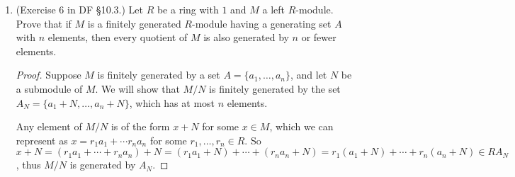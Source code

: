 \documentclass[10pt]{article}
\begin{document}
\begin{enumerate}
\begin{proof}
We may assume $R$ is not a field, since we are taking the result for granted in that case.  Therefore, $R$ contains a nonzero, proper ideal; by Proposition 11 in \S 7.4, this ideal must be contained in some maximal ideal $I$.  $R$ is commutative, so $IR = I$ and $R / IR = R / I$ is a field.  Therefore, by the result we are taking for granted, $(R/IR)^n \cong (R/IR)^m$ if and only if $n = m$.  By Exercise 12 of \S 10.2, $R^k / IR^k \cong (R/IR)^k$, so $R^n / IR^n \cong (R/IR)^n \cong (R/IR)^m \cong R^m / IR^m$ if and only if $n = m$.

Clearly, $R^n \cong R^m$ if $n = m$, so assume that $n \neq m$ but $R^n \cong R^m$.  Let $\varphi: R^n \rightarrow R^m$ be an isomorphism, and let $\overline{\varphi}: R^n \rightarrow R^m/IR^m$ be the composition of $\varphi$ with the natural projection $R^m \rightarrow R^m/IR^m$.

First, let $x \in IR^n$.  Then $x = r_1x_1 + \cdots + r_kx_k$ for some $r_i \in I$, $x_i \in R^n$.  Thus $\varphi(x) = r_1\varphi(x_1) + \cdots r_k \varphi(x_k) \in IR^m$ since $r_i \in I$ and $\varphi(x_i) \in R^m$.  So $\varphi(x) \in 0 + IR^m$, thus $x \in \ker(\overline{\varphi})$.

Conversely, assume $x \in \ker(\overline{\varphi})$.  Then $x \mapsto 0 + IR^m$, so $\varphi(x) \in IR^m$.  So $\varphi(x) = r_1x_1 + \cdots + r_kx_k$ for some $r_i \in I$, $x_i \in R^m$.  So $x = r_1\varphi^{-1}(x_1) + \cdots + r_k\varphi^{-1}(x_k) \in IR^n$.  So $\ker(\overline{\varphi}) = IR^n$, thus by the first isomorphism theorem $R^n / IR^n \cong R^m / IR^m$.  This contradicts the result of the previous paragraph.
\end{proof}

\item (Exercise 6 in DF \S 10.3.) Let $R$ be a ring with $1$ and $M$ a left $R$-module.  Prove that if $M$ is a finitely generated $R$-module having a generating set $A$ with $n$ elements, then every quotient of $M$ is also generated by $n$ or fewer elements.

\begin{proof}
Suppose $M$ is finitely generated by a set $A = \{a_1, \dots , a_n \}$, and let $N$ be a submodule of $M$.  We will show that $M/N$ is finitely generated by the set $A_N = \{a_1 + N, \dots , a_n + N \}$, which has at most $n$ elements.

Any element of $M/N$ is of the form $x + N$ for some $x \in M$, which we can represent as $x = r_1a_1 + \cdots r_na_n$ for some $r_1, \dots , r_n \in R$.  So $x + N = (r_1a_1 + \cdots + r_na_n) + N = (r_1a_1 + N) + \cdots + (r_na_n + N) = r_1(a_1 + N) + \cdots + r_n(a_n + N) \in RA_N$, thus $M/N$ is generated by $A_N$.
\end{proof}


\end{enumerate}
\end{document}
